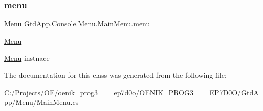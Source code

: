 \subsubsection{\texorpdfstring{menu}{menu}}
{\footnotesize\ttfamily \mbox{\hyperlink{class_gtd_app_1_1_console_core_1_1_menu_1_1_menu}{Menu}} Gtd\+App.\+Console.\+Menu.\+Main\+Menu.\+menu\hspace{0.3cm}{\ttfamily [private]}}



\mbox{\hyperlink{namespace_gtd_app_1_1_console_1_1_menu}{Menu}} 

\mbox{\hyperlink{namespace_gtd_app_1_1_console_1_1_menu}{Menu}} instnace

The documentation for this class was generated from the following file\+:\begin{DoxyCompactItemize}
\item 
C\+:/\+Projects/\+O\+E/oenik\+\_\+prog3\+\_\+\_\+\_\+ep7d0o/\+O\+E\+N\+I\+K\+\_\+\+P\+R\+O\+G3\+\_\+\_\+\_\+\+E\+P7\+D0\+O/\+Gtd\+App/\+Menu/Main\+Menu.\+cs\end{DoxyCompactItemize}
